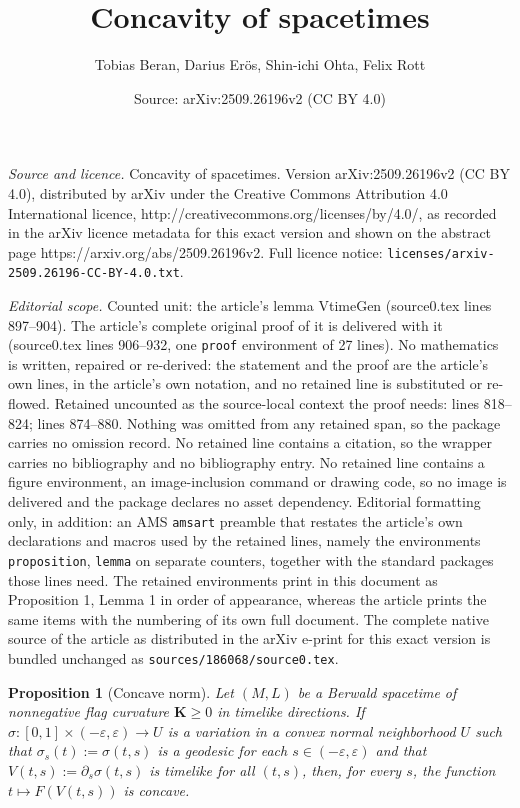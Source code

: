 \documentclass[10pt,a4paper]{amsart}
\title{Concavity of spacetimes}
\author{Tobias Beran, Darius Er\"os, Shin-ichi Ohta, Felix Rott}
\date{Source: arXiv:2509.26196v2 (CC BY 4.0)}
\newtheorem{proposition}{Proposition}
\newcommand{\bK}{\mathbf{K}}
\newcommand{\bL}{\mathbf{L}}
\newcommand{\lra}{\longrightarrow}
\newcommand{\ve}{\varepsilon}
\begin{document}
\maketitle

\noindent\emph{Source and licence.} Concavity of spacetimes. Version arXiv:2509.26196v2 (CC BY 4.0), distributed by arXiv under the Creative Commons Attribution 4.0 International licence, http://creativecommons.org/licenses/by/4.0/, as recorded in the arXiv licence metadata for this exact version and shown on the abstract page https://arxiv.org/abs/2509.26196v2. Full licence notice: \texttt{licenses/arxiv-2509.26196-CC-BY-4.0.txt}.\par\smallskip

\noindent\textit{Editorial scope.} Counted unit: the article's lemma VtimeGen (source0.tex lines 897--904). The article's complete original proof of it is delivered with it (source0.tex lines 906--932, one \texttt{proof} environment of 27 lines). No mathematics is written, repaired or re-derived: the statement and the proof are the article's own lines, in the article's own notation, and no retained line is substituted or re-flowed.  Retained uncounted as the source-local context the proof needs: lines 818--824; lines 874--880.  Nothing was omitted from any retained span, so the package carries no omission record.  No retained line contains a citation, so the wrapper carries no bibliography and no bibliography entry.  No retained line contains a figure environment, an image-inclusion command or drawing code, so no image is delivered and the package declares no asset dependency.  Editorial formatting only, in addition: an AMS \texttt{amsart} preamble that restates the article's own declarations and macros used by the retained lines, namely the environments \texttt{proposition}, \texttt{lemma} on separate counters, together with the standard packages those lines need.  The retained environments print in this document as Proposition 1, Lemma 1 in order of appearance, whereas the article prints the same items with the numbering of its own full document.  The complete native source of the article as distributed in the arXiv e-print for this exact version is bundled unchanged as \texttt{sources/186068/source0.tex}.
\begin{proposition}[Concave norm]
\label{prop: concave length}
Let $(M,L)$ be a Berwald spacetime
of nonnegative flag curvature $\bK \ge 0$ in timelike directions. 
If $\sigma \colon [0,1] \times (-\ve,\ve) \lra U$ is a variation in a convex normal neighborhood $U$ such that $\sigma_s(t):=\sigma(t,s)$ is a geodesic for each $s \in (-\ve,\ve)$ and that $V(t,s):=\partial_s\sigma(t,s)$ is timelike for all $(t,s)$, then, for every $s$, the function $t\longmapsto F(V(t,s))$ is concave. 
\end{proposition}
\end{document}

